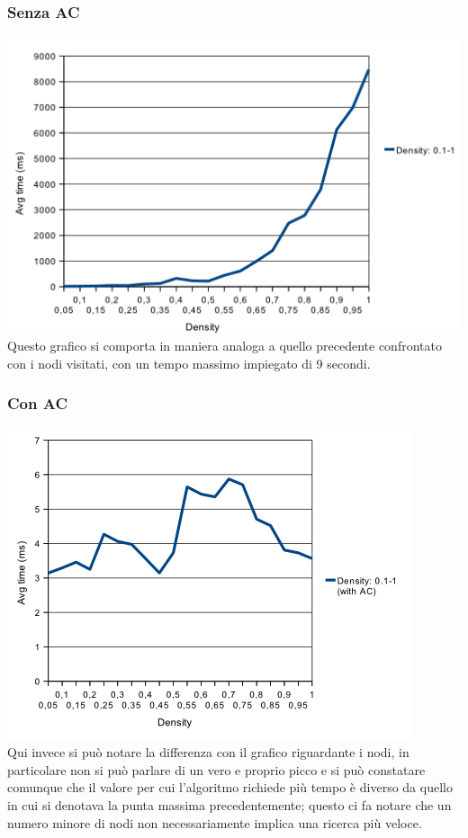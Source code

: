 \documentclass[a4paper,12pt,italian]{article}
\begin{document}
\subsubsection{Senza AC}
\includegraphics[scale=0.8]{densTime.png}
\\
Questo grafico si comporta in maniera analoga a quello precedente confrontato con i nodi visitati,
con un tempo massimo impiegato di 9 secondi.

\subsubsection{Con AC}
\includegraphics[scale=0.8]{densACTime.png}
\\
Qui invece si pu\`o notare la differenza con il grafico riguardante i nodi, in particolare
non si pu\`o parlare di un vero e proprio picco e si pu\`o constatare comunque che il valore
per cui l'algoritmo richiede pi\`u tempo \`e diverso da quello in cui si denotava la punta massima 
precedentemente; questo ci fa notare che un numero minore di nodi non necessariamente implica una 
ricerca pi\`u veloce.
\end{document}
